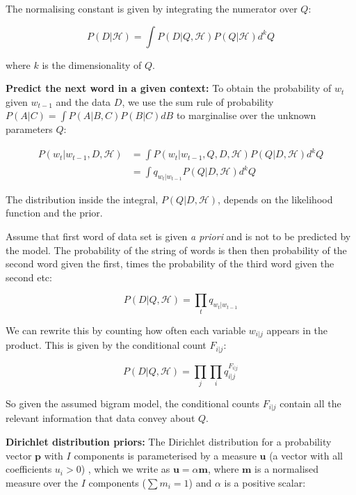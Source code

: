 \noindent The normalising constant is given by integrating the numerator over $Q$:

\begin{equation}
P(D|\mathscr{H})=\int P(D|Q, \mathscr{H})P(Q|\mathscr{H})d^{k}Q
\end{equation}

\noindent where $k$ is the dimensionality of $Q$.

\textbf{Predict the next word in a given context: } To obtain the probability of $w_{t}$ given $w_{t-1}$ and the data $D$, we use the sum rule of probability $P(A|C)=\int P(A|B, C)P(B|C)dB$ to marginalise over the unknown parameters $Q$:

\begin{align}
P(w_{t}|w_{t-1}, D, \mathscr{H}) &= \int P(w_{t}|w_{t-1}, Q, D, \mathscr{H})P(Q|D, \mathscr{H})d^{k}Q
\\
&= \int q_{w_{t}|w_{t-1}}P(Q|D, \mathscr{H})d^{k}Q
\end{align}

\noindent The distribution inside the integral, $P(Q|D, \mathscr{H})$, depends on the likelihood function and the prior.

Assume that first word of data set is given \textit{a priori} and is not to be predicted by the model. The probability of the string of words is then then probability of the second word given the first, times the probability of the third word given the second etc:

\begin{equation}
P(D|Q, \mathscr{H})=\prod_{t}q_{w_{t}|w_{t-1}}
\end{equation}

\noindent We can rewrite this by counting how often each variable $w_{i|j}$ appears in the product. This is given by the conditional count $F_{i|j}$:

\begin{equation}
P(D|Q, \mathscr{H})=\prod_{j}\prod_{i}q_{i|j}^{F_{i|j}}
\end{equation}

\noindent So given the assumed bigram model, the conditional counts $F_{i|j}$ contain all the relevant information that data convey about $Q$.

\textbf{Dirichlet distribution priors: }The Dirichlet distribution for a probability vector $\boldsymbol{p}$ with $I$ components is parameterised by a measure $\boldsymbol{u}$ (a vector with all coefficients $u_{i}>0$) , which we write as $\boldsymbol{u}=\alpha\boldsymbol{m}$, where $\boldsymbol{m}$ is a normalised measure over the $I$ components ($\sum m_{i}=1$) and $\alpha$ is a positive scalar:

